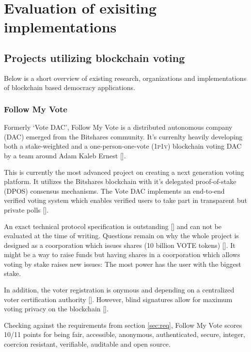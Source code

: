 
\section{Evaluation of exisiting implementations}

\subsection{Projects utilizing blockchain voting}
Below is a short overview of existing research, organizations and implementations of blockchain based democracy applications.


\subsubsection{Follow My Vote}
Formerly \enquote*{Vote DAC}, Follow My Vote is a distributed autonomous company (\textsc{DAC}) emerged from the Bitshares community. It's currenlty heavily developing both a stake-weighted and a one-person-one-vote (\textsc{1p1v}) blockchain voting DAC by a team around Adam Kaleb Ernest [\cite{ERNEST2016}].\par
This is currently the most advanced project on creating a next generation voting platform. It utilizes the Bitshares blockchain with it's delegated proof-of-stake (\textsc{DPOS}) consensus mechanisms. The Vote DAC implements an end-to-end verified voting system which enables verified users to take part in transparent but private polls [\cite{ERNEST2014}].\par
An exact technical protocol specification is outstanding [\cite{VARSHNEYA2015}] and can not be evaluated at the time of writing. Questions remain on why the whole project is designed as a coorporation which issues shares (10 billion VOTE tokens) [\cite{ERNEST2014}]. It might be a way to raise funds but having shares in a coorporation which allows voting by stake raises new issues: The most power has the user with the biggest stake.\par
In addition, the voter registration is onymous and depending on a centralized voter certification authority [\cite{VARSHNEYA2015}]. However, blind signatures allow for maximum voting privacy on the blockchain [\cite{HOURT2015B}].\par
Checking against the requirements from section \ref{sec:req}, Follow My Vote scores 10/11 points for being fair, accessible, anonymous, authenticated, secure, integer, coercion resistant, verifiable, auditable and open source.

